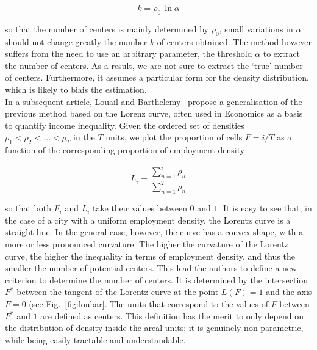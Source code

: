 \begin{equation}
    k = \rho_0\,\ln \alpha
\end{equation}

so that the number of centers is mainly determined by $\rho_0$, small variations
in $\alpha$ should not change greatly the number $k$ of centers obtained.
The method however suffers from the need to use an arbitrary parameter, the
threshold $\alpha$ to extract the number of centers. As a result, we are not
sure to extract the `true' number of centers. Furthermore, it assumes a
particular form for the density distribution, which is likely to biais the
estimation.\\

In a subsequent article, Louail and Barthelemy~\cite{Louail:2014} propose a
generalisation of the previous method based on the Lorenz curve, often used in
Economics as a basis to quantify income inequality. Given the ordered set of
densities $\rho_1 < \rho_2 < \dots < \rho_T$ in the $T$ units, we plot the
proportion of cells $F=i/T$ as a function of the corresponding proportion of
employment density

\begin{equation}
    L_i = \frac{\sum_{n=1}^i \rho_n}{\sum_{n=1}^T \rho_n}
\end{equation}

so that both $F_i$ and $L_i$ take their values between $0$ and $1$. It is easy
to see that, in the case of a city with a uniform employment density, the
Lorentz curve is a straight line. In the general case, however, the curve has a
convex shape, with a more or less pronounced curvature.  The higher the
curvature of the Lorentz curve, the higher the inequality in terms of employment
density, and thus the smaller the number of potential centers. This lead the
authors to define a new criterion to determine the number of centers. It is
determined by the intersection $F^*$ between the tangent of the Lorentz curve at
the point $L(F) = 1$ and the axis $F=0$ (see Fig.~\ref{fig:loubar}. The units
that correspond to the values of $F$ between $F^*$ and $1$ are defined as
centers. This definition has the merit to only depend on the distribution of
density inside the areal units; it is genuinely non-parametric, while being
easily tractable and understandable.\\

